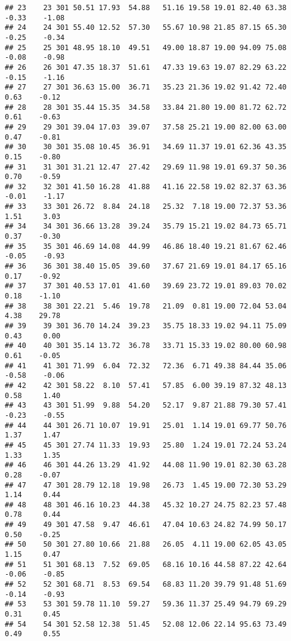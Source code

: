 \documentclass[
]{article}
\begin{document}
\begin{verbatim}
## 23    23 301 50.51 17.93  54.88   51.16 19.58 19.01 82.40 63.38 -0.33    -1.08
## 24    24 301 55.40 12.52  57.30   55.67 10.98 21.85 87.15 65.30 -0.25    -0.34
## 25    25 301 48.95 18.10  49.51   49.00 18.87 19.00 94.09 75.08 -0.08    -0.98
## 26    26 301 47.35 18.37  51.61   47.33 19.63 19.07 82.29 63.22 -0.15    -1.16
## 27    27 301 36.63 15.00  36.71   35.23 21.36 19.02 91.42 72.40  0.63    -0.12
## 28    28 301 35.44 15.35  34.58   33.84 21.80 19.00 81.72 62.72  0.61    -0.63
## 29    29 301 39.04 17.03  39.07   37.58 25.21 19.00 82.00 63.00  0.47    -0.81
## 30    30 301 35.08 10.45  36.91   34.69 11.37 19.01 62.36 43.35  0.15    -0.80
## 31    31 301 31.21 12.47  27.42   29.69 11.98 19.01 69.37 50.36  0.70    -0.59
## 32    32 301 41.50 16.28  41.88   41.16 22.58 19.02 82.37 63.36 -0.01    -1.17
## 33    33 301 26.72  8.84  24.18   25.32  7.18 19.00 72.37 53.36  1.51     3.03
## 34    34 301 36.66 13.28  39.24   35.79 15.21 19.02 84.73 65.71  0.37    -0.30
## 35    35 301 46.69 14.08  44.99   46.86 18.40 19.21 81.67 62.46 -0.05    -0.93
## 36    36 301 38.40 15.05  39.60   37.67 21.69 19.01 84.17 65.16  0.17    -0.92
## 37    37 301 40.53 17.01  41.60   39.69 23.72 19.01 89.03 70.02  0.18    -1.10
## 38    38 301 22.21  5.46  19.78   21.09  0.81 19.00 72.04 53.04  4.38    29.78
## 39    39 301 36.70 14.24  39.23   35.75 18.33 19.02 94.11 75.09  0.43     0.00
## 40    40 301 35.14 13.72  36.78   33.71 15.33 19.02 80.00 60.98  0.61    -0.05
## 41    41 301 71.99  6.04  72.32   72.36  6.71 49.38 84.44 35.06 -0.58    -0.06
## 42    42 301 58.22  8.10  57.41   57.85  6.00 39.19 87.32 48.13  0.58     1.40
## 43    43 301 51.99  9.88  54.20   52.17  9.87 21.88 79.30 57.41 -0.23    -0.55
## 44    44 301 26.71 10.07  19.91   25.01  1.14 19.01 69.77 50.76  1.37     1.47
## 45    45 301 27.74 11.33  19.93   25.80  1.24 19.01 72.24 53.24  1.33     1.35
## 46    46 301 44.26 13.29  41.92   44.08 11.90 19.01 82.30 63.28  0.28    -0.07
## 47    47 301 28.79 12.18  19.98   26.73  1.45 19.00 72.30 53.29  1.14     0.44
## 48    48 301 46.16 10.23  44.38   45.32 10.27 24.75 82.23 57.48  0.78     0.44
## 49    49 301 47.58  9.47  46.61   47.04 10.63 24.82 74.99 50.17  0.50    -0.25
## 50    50 301 27.80 10.66  21.88   26.05  4.11 19.00 62.05 43.05  1.15     0.47
## 51    51 301 68.13  7.52  69.05   68.16 10.16 44.58 87.22 42.64 -0.06    -0.85
## 52    52 301 68.71  8.53  69.54   68.83 11.20 39.79 91.48 51.69 -0.14    -0.93
## 53    53 301 59.78 11.10  59.27   59.36 11.37 25.49 94.79 69.29  0.31     0.45
## 54    54 301 52.58 12.38  51.45   52.08 12.06 22.14 95.63 73.49  0.49     0.55

\end{verbatim}
\end{document}
